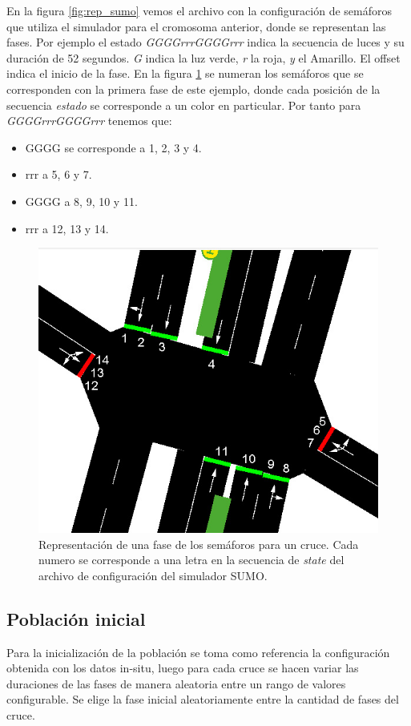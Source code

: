 En la figura \ref{fig:rep_sumo} vemos el archivo con la configuración de semáforos que utiliza el simulador para el cromosoma anterior, donde se representan las fases. Por ejemplo el estado \emph{GGGGrrrGGGGrrr} indica la secuencia de luces y su duración de 52 segundos. \emph{G} indica la luz verde, \emph{r} la roja, \emph{y} el Amarillo. El offset indica el inicio de la fase. En la figura \ref{fig:sem_numerados} se numeran los semáforos que se corresponden con la primera fase de este ejemplo, donde cada posición de la secuencia \emph{estado} se corresponde a un color en particular. Por tanto para \emph{GGGGrrrGGGGrrr} tenemos que:
\begin{itemize}
\item GGGG se corresponde a 1, 2, 3 y 4. 
\item rrr a 5, 6 y 7. 
\item GGGG a 8, 9, 10 y 11. 
\item rrr a 12, 13 y 14. 
\end{itemize}
  




\begin{figure}[H]
	\centering
	\includegraphics[width=0.7\linewidth]{Figures/semaforos_numerado}
	\caption{Representación de una fase de los semáforos para un cruce. Cada numero se corresponde a una letra en la secuencia de \emph{state} del archivo de configuración del simulador SUMO.}
	\label{fig:sem_numerados}
\end{figure}

\subsection{Población inicial}

Para la inicialización de la población se toma como referencia
la configuración obtenida con los datos in-situ, luego para cada
cruce se hacen variar las duraciones de las fases de manera aleatoria entre un rango de valores configurable. Se elige la fase inicial aleatoriamente entre la cantidad de fases del cruce.

